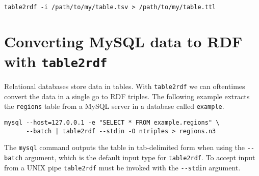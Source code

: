 \begin{siderules}
\begin{verbatim}
table2rdf -i /path/to/my/table.tsv > /path/to/my/table.ttl
\end{verbatim}
\end{siderules}

\section{Converting MySQL data to RDF with \texttt{table2rdf}}

  Relational databases store data in tables.  With \texttt{table2rdf} we
  can oftentimes convert the data in a single go to RDF triples.  The following
  example extracts the \texttt{regions} table from a MySQL server in a database
  called \texttt{example}.

\begin{siderules}
\begin{verbatim}
mysql --host=127.0.0.1 -e "SELECT * FROM example.regions" \
      --batch | table2rdf --stdin -O ntriples > regions.n3
\end{verbatim}
\end{siderules}

  The \texttt{mysql} command outputs the table in tab-delimited form when using
  the \texttt{-{}-batch} argument, which is the default input type for
  \texttt{table2rdf}.  To accept input from a UNIX pipe \texttt{table2rdf} must
  be invoked with the \texttt{-{}-stdin} argument.





